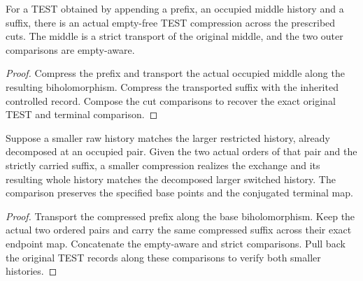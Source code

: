 \begin{theorem}
\label{hir:g8-actual-compression-cuts}
\leanok
For a TEST obtained by appending a prefix, an occupied middle history
and a suffix, there is an actual empty-free TEST compression across
the prescribed cuts. The middle is a strict transport of the original
middle, and the two outer comparisons are empty-aware.
\end{theorem}
\begin{proof}
Compress the prefix and transport the actual occupied middle along
the resulting biholomorphism. Compress the transported suffix with
the inherited controlled record. Compose the cut comparisons to
recover the exact original TEST and terminal comparison.
\end{proof}

\begin{theorem}
\label{hir:g8-compressed-cut-exchange}
\leanok
Suppose a smaller raw history matches the larger restricted history,
already decomposed at an occupied pair. Given the two actual orders of
that pair and the strictly carried suffix, a smaller compression
realizes the exchange and its resulting whole history matches the
decomposed larger switched history. The comparison preserves the
specified base points and the conjugated terminal map.
\end{theorem}
\begin{proof}
Transport the compressed prefix along the base biholomorphism.
Keep the actual two ordered pairs and carry the same compressed
suffix across their exact endpoint map. Concatenate the empty-aware
and strict comparisons. Pull back the original TEST records along
these comparisons to verify both smaller histories.
\end{proof}

